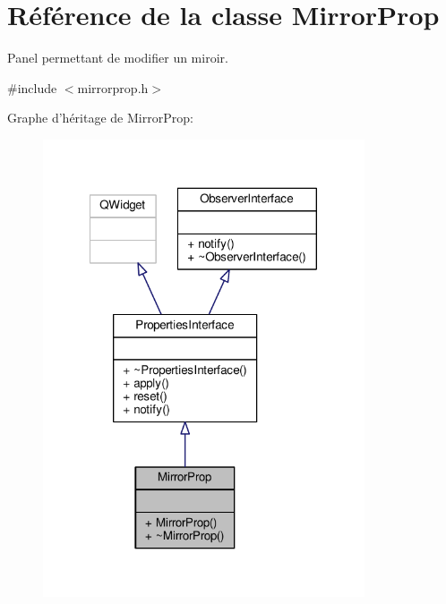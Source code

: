 \hypertarget{classMirrorProp}{\section{Référence de la classe Mirror\+Prop}
\label{classMirrorProp}
}


Panel permettant de modifier un miroir.  




{\ttfamily \#include $<$mirrorprop.\+h$>$}



Graphe d'héritage de Mirror\+Prop\+:
\nopagebreak
\begin{figure}[H]
\begin{center}
\leavevmode
\includegraphics[width=269pt]{dc/d36/classMirrorProp__inherit__graph}
\end{center}
\end{figure}


